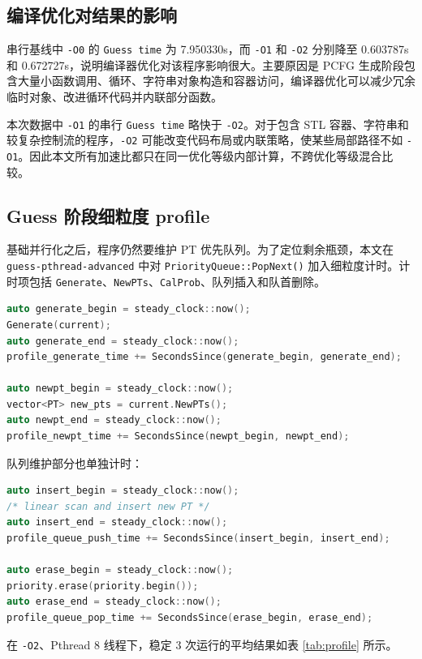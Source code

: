 \documentclass[UTF8,a4paper,12pt]{ctexart}
\begin{document}
\subsection{编译优化对结果的影响}

串行基线中 \texttt{-O0} 的 \texttt{Guess time} 为 7.950330s，而 \texttt{-O1} 和 \texttt{-O2} 分别降至 0.603787s 和 0.672727s，说明编译器优化对该程序影响很大。主要原因是 PCFG 生成阶段包含大量小函数调用、循环、字符串对象构造和容器访问，编译器优化可以减少冗余临时对象、改进循环代码并内联部分函数。

本次数据中 \texttt{-O1} 的串行 \texttt{Guess time} 略快于 \texttt{-O2}。对于包含 STL 容器、字符串和较复杂控制流的程序，\texttt{-O2} 可能改变代码布局或内联策略，使某些局部路径不如 \texttt{-O1}。因此本文所有加速比都只在同一优化等级内部计算，不跨优化等级混合比较。

\subsection{Guess 阶段细粒度 profile}

基础并行化之后，程序仍然要维护 PT 优先队列。为了定位剩余瓶颈，本文在 \texttt{guess-pthread-advanced} 中对 \texttt{PriorityQueue::PopNext()} 加入细粒度计时。计时项包括 \texttt{Generate}、\texttt{NewPTs}、\texttt{CalProb}、队列插入和队首删除。

\begin{lstlisting}[language=C++]
auto generate_begin = steady_clock::now();
Generate(current);
auto generate_end = steady_clock::now();
profile_generate_time += SecondsSince(generate_begin, generate_end);

auto newpt_begin = steady_clock::now();
vector<PT> new_pts = current.NewPTs();
auto newpt_end = steady_clock::now();
profile_newpt_time += SecondsSince(newpt_begin, newpt_end);
\end{lstlisting}

队列维护部分也单独计时：

\begin{lstlisting}[language=C++]
auto insert_begin = steady_clock::now();
/* linear scan and insert new PT */
auto insert_end = steady_clock::now();
profile_queue_push_time += SecondsSince(insert_begin, insert_end);

auto erase_begin = steady_clock::now();
priority.erase(priority.begin());
auto erase_end = steady_clock::now();
profile_queue_pop_time += SecondsSince(erase_begin, erase_end);
\end{lstlisting}

在 \texttt{-O2}、Pthread 8 线程下，稳定 3 次运行的平均结果如表 \ref{tab:profile} 所示。
\end{document}
